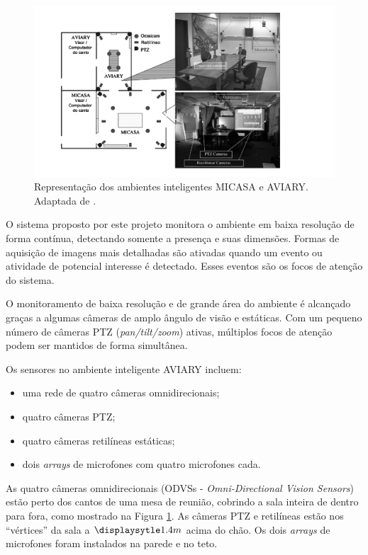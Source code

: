 \begin{figure}[hbt]
		\begin{center}
	\includegraphics[scale=0.5]{figuras/3.TrabalhosCorrelatos/micasa_aviary.png}
		\end{center}
		\caption{Representação dos ambientes inteligentes MICASA e
		AVIARY. Adaptada de \cite{trivedi}.}
		\label{micasa_aviary}
	\end{figure}

O sistema proposto por este projeto monitora o ambiente em baixa resolução de forma contínua, detectando somente a presença e suas dimensões. Formas de aquisição de imagens mais detalhadas são ativadas quando um evento ou atividade de potencial interesse é detectado. Esses eventos são os focos de atenção do sistema.

O monitoramento de baixa resolução e de grande área do ambiente é alcançado graças a algumas câmeras de amplo ângulo de visão e estáticas. Com um pequeno número de câmeras PTZ (\textit{pan/tilt/zoom}) ativas, múltiplos focos de atenção podem ser mantidos de forma simultânea.

Os sensores no ambiente inteligente AVIARY incluem:

	\begin{itemize}
		\item uma rede de quatro câmeras omnidirecionais;
		\item quatro câmeras PTZ;
		\item quatro câmeras retilíneas estáticas;
		\item dois \textit{arrays} de microfones com quatro microfones cada.
	\end{itemize}

As quatro câmeras omnidirecionais (ODVSs - \textit{Omni-Directional Vision Sensors}) estão perto dos cantos de uma mesa de reunião, cobrindo a sala inteira de dentro para fora, como mostrado na Figura \ref{micasa_aviary}. As câmeras PTZ e retilíneas estão nos ``vértices'' da sala a $\displaysytle 1.4m$ acima do chão. Os dois \textit{arrays} de microfones foram instalados na parede e no teto.

